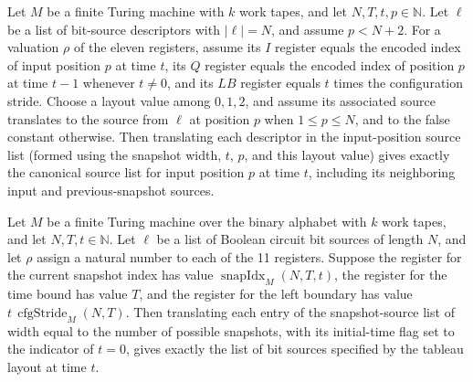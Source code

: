 \begin{theorem}
\label{Complexity.UTab.inpS_toBitSrc}
\leanok
{}
Let $M$ be a finite Turing machine with $k$ work tapes, and let $N,T,t,p\in\mathbb N$.
Let $\ell$ be a list of bit-source descriptors with $|\ell|=N$, and assume $p<N+2$. For
a valuation $\rho$ of the eleven registers, assume its $I$ register equals the encoded
index of input position $p$ at time $t$, its $Q$ register equals the encoded index of
position $p$ at time $t-1$ whenever $t\ne0$, and its $LB$ register equals $t$ times the
configuration stride. Choose a layout value among $0,1,2$, and assume its associated
source translates to the source from $\ell$ at position $p$ when $1\le p\le N$, and to
the false constant otherwise. Then translating each descriptor in the input-position
source list (formed using the snapshot width, $t$, $p$, and this layout value) gives
exactly the canonical source list for input position $p$ at time $t$, including its
neighboring input and previous-snapshot sources.
\end{theorem}

\begin{theorem}
\label{Complexity.UTab.snapS_toBitSrc}
\leanok
{}
Let $M$ be a finite Turing machine over the binary alphabet with $k$ work tapes, and let
$N,T,t\in\mathbb{N}$. Let $\ell$ be a list of Boolean circuit bit sources of length $N$,
and let $\rho$ assign a natural number to each of the 11 registers. Suppose the register
for the current snapshot index has value $\operatorname{snapIdx}_M(N,T,t)$, the register
for the time bound has value $T$, and the register for the left boundary has value
$t\,\operatorname{cfgStride}_M(N,T)$. Then translating each entry of the snapshot-source
list of width equal to the number of possible snapshots, with its initial-time flag set
to the indicator of $t=0$, gives exactly the list of bit sources specified by the
tableau layout at time $t$.
\end{theorem}
